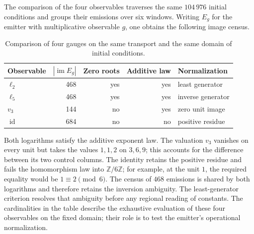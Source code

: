 The comparison of the four observables traverses the same
\(104\,976\) initial conditions and groups their emissions over six
windows. Writing \(E_g\) for the emitter with multiplicative
observable \(g\), one obtains the following image census.
\begin{table}[htbp]
\centering
\small
\begin{tabular}{@{}lrrrl@{}}
\toprule
Observable & \(|\operatorname{im}E_g|\) & Zero roots
 & Additive law & Normalization\\
\midrule
\(\ell_2\)&468&yes&yes&least generator\\
\(\ell_5\)&468&yes&yes&inverse generator\\
\(v_3\)&144&no&yes&zero unit image\\
\(\operatorname{id}\)&684&no&no&positive residue\\
\bottomrule
\end{tabular}
\caption{Comparison of four gauges on the same transport and the same domain of initial conditions.}
\label{mg05:tabla-calibres}
\end{table}

Both logarithms satisfy the additive exponent law. The valuation
\(v_3\) vanishes on every unit but takes the values \(1,1,2\) on
\(3,6,9\); this accounts for the difference between its two control
columns. The identity retains the positive residue and fails the
homomorphism law into \(\mathbb Z/6\mathbb Z\); for example, at
the unit \(1\), the required equality would be \(1\equiv2\pmod6\).
The census of \(468\) emissions is shared by both logarithms and
therefore retains the inversion ambiguity. The least-generator
criterion resolves that ambiguity before any regional reading of
constants. The cardinalities in the table describe the exhaustive
evaluation of these four observables on the fixed domain; their
role is to test the emitter's operational normalization.
